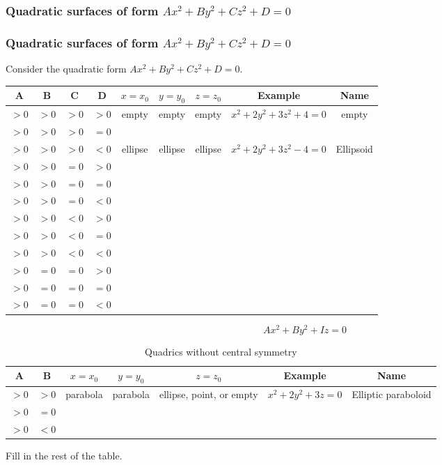 

\begin{frame}
\frametitle{Quadratic surfaces of form $Ax^2+By^2+Cz^2+D=0$}


\end{frame}

\begin{frame}
\frametitle{Quadratic surfaces of form $Ax^2+By^2+Cz^2+D=0$}
Consider the quadratic form $Ax^2+By^2+Cz^2+D=0$. 
\begin{tabular}{|c|c|c|c|c|c|c|c|c|}
  \hline
  A & B & C & D & $x=x_0$ & $y=y_0$ & $z=z_0$ & Example & Name
  \\
  \hline
  $>0$ & $>0$ & $>0$ & $>0$ & empty & empty & empty & $x^2+2y^2+3z^2+4=0$ & empty \\
  \hline
  $>0$ & $>0$ & $>0$ & $=0$ &  &  &  &  &  \\
  \hline
  $>0$ & $>0$ & $>0$ & $<0$ & ellipse & ellipse & ellipse & $x^2+2y^2+3z^2-4=0$ & Ellipsoid \\
  \hline
  $>0$ & $>0$ & $=0$ & $>0$ &  &  &  &  &  \\
  \hline
  $>0$ & $>0$ & $=0$ & $=0$ &  &  &  &  &  \\
  \hline
  $>0$ & $>0$ & $=0$ & $<0$ &  &  &  &  &  \\
  \hline
  $>0$ & $>0$ & $<0$ & $>0$ &  &  &  &  &  \\
  \hline
  $>0$ & $>0$ & $<0$ & $=0$ &  &  &  &  &  \\
  \hline
  $>0$ & $>0$ & $<0$ & $<0$ &  &  &  &  &  \\
  \hline
  $>0$ & $=0$ & $=0$ & $>0$ &  &  &  &  &  \\
  \hline
  $>0$ & $=0$ & $=0$ & $=0$ &  &  &  &  &  \\
  \hline
  $>0$ & $=0$ & $=0$ & $<0$ &  &  &  &  &  \\
  \hline
\end{tabular}

\end{frame}

\begin{frame}
\begin{equation*}
Ax^2+By^2+Iz=0
\end{equation*}

\begin{table}
\begin{tabular}{|c|c|c|c|c|c|c|}
  \hline
  A & B  & $x=x_0$ & $y=y_0$ & $z=z_0$ & Example & Name
  \\
  \hline
  $>0$ & $>0$   & parabola & parabola & ellipse, point, or empty & $x^2+2y^2+3z=0$ & Elliptic paraboloid \\
  \hline
  $>0$ & $=0$ & &  &  &  &   \\
  \hline
  $>0$ & $<0$ &  &  &  &  &   \\
  \hline
\end{tabular}
  \caption{Quadrics without central symmetry}
\end{table}
\bigskip

Fill in the rest of the table.
\end{frame}